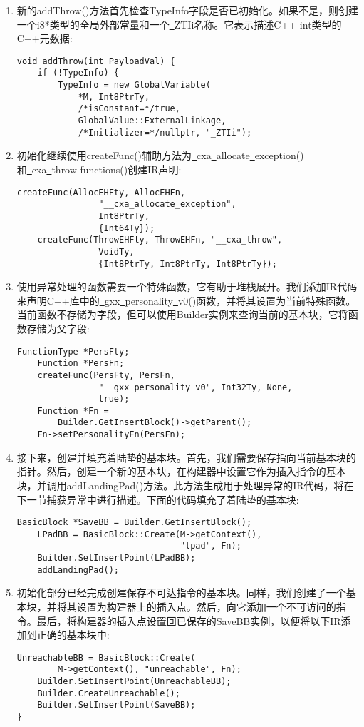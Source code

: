 \begin{enumerate}
\item 新的addThrow()方法首先检查TypeInfo字段是否已初始化。如果不是，则创建一个i8*类型的全局外部常量和一个\underline{~}ZTIi名称。它表示描述C++ int类型的C++元数据:
\begin{lstlisting}[caption={}]
void addThrow(int PayloadVal) {
	if (!TypeInfo) {
		TypeInfo = new GlobalVariable(
			*M, Int8PtrTy,
			/*isConstant=*/true,
			GlobalValue::ExternalLinkage,
			/*Initializer=*/nullptr, "_ZTIi");
\end{lstlisting}

\item 初始化继续使用createFunc()辅助方法为\underline{~}cxa\underline{~}allocate\underline{~}exception()和\underline{~}cxa\underline{~}throw functions()创建IR声明:
\begin{lstlisting}[caption={}]
	createFunc(AllocEHFty, AllocEHFn,
				"__cxa_allocate_exception", 
				Int8PtrTy,
				{Int64Ty});
	createFunc(ThrowEHFty, ThrowEHFn, "__cxa_throw",
				VoidTy,
				{Int8PtrTy, Int8PtrTy, Int8PtrTy});
\end{lstlisting}

\item 使用异常处理的函数需要一个特殊函数，它有助于堆栈展开。我们添加IR代码来声明C++库中的\underline{~}gxx\underline{~}personality\underline{~}v0()函数，并将其设置为当前特殊函数。当前函数不存储为字段，但可以使用Builder实例来查询当前的基本块，它将函数存储为父字段:
\begin{lstlisting}[caption={}]
	FunctionType *PersFty;
	Function *PersFn;
	createFunc(PersFty, PersFn,
				"__gxx_personality_v0", Int32Ty, None,
				true);
	Function *Fn =
		Builder.GetInsertBlock()->getParent();
	Fn->setPersonalityFn(PersFn);
\end{lstlisting}

\item 接下来，创建并填充着陆垫的基本块。首先，我们需要保存指向当前基本块的指针。然后，创建一个新的基本块，在构建器中设置它作为插入指令的基本块，并调用addLandingPad()方法。此方法生成用于处理异常的IR代码，将在下一节捕获异常中进行描述。下面的代码填充了着陆垫的基本块:
\begin{lstlisting}[caption={}]
	BasicBlock *SaveBB = Builder.GetInsertBlock();
	LPadBB = BasicBlock::Create(M->getContext(),
								"lpad", Fn);
	Builder.SetInsertPoint(LPadBB);
	addLandingPad();
\end{lstlisting}

\item 初始化部分已经完成创建保存不可达指令的基本块。同样，我们创建了一个基本块，并将其设置为构建器上的插入点。然后，向它添加一个不可访问的指令。最后，将构建器的插入点设置回已保存的SaveBB实例，以便将以下IR添加到正确的基本块中:
\begin{lstlisting}[caption={}]
	UnreachableBB = BasicBlock::Create(
		M->getContext(), "unreachable", Fn);
	Builder.SetInsertPoint(UnreachableBB);
	Builder.CreateUnreachable();
	Builder.SetInsertPoint(SaveBB);
}
\end{lstlisting}


\end{enumerate}
